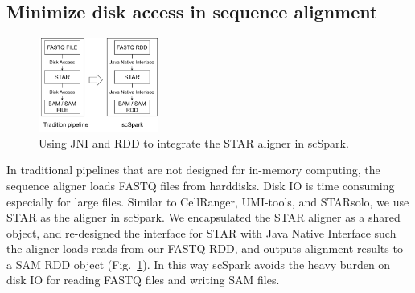 \documentclass[conference]{IEEEtran}
\begin{document}

\subsection{Minimize disk access in sequence alignment}
\begin{figure}
\centering
	\includegraphics[width=0.35\textwidth]{figure2.png}
	\caption{Using JNI and RDD to integrate the STAR aligner in scSpark.} \label{fig2}
\end{figure}

In traditional pipelines that are not designed for in-memory computing, the sequence aligner loads FASTQ files from harddisks. 
Disk IO is time consuming especially for large files. 
Similar to CellRanger, UMI-tools, and STARsolo, we use STAR as the aligner in scSpark. 
We encapsulated the STAR aligner as a shared object, and re-designed the interface for STAR with Java Native Interface such the aligner loads reads from our FASTQ RDD, and outputs alignment results to a SAM RDD object (Fig.~\ref{fig2}). 
In this way scSpark avoids the heavy burden on disk IO for reading FASTQ files and writing SAM files. 
\end{document}
